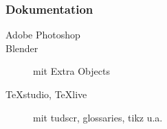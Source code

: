\subsubsection{Dokumentation}
\begin{description}
	\item [Adobe Photoshop]
	\item [Blender] mit Extra Objects
	\item [TeXstudio, TeXlive] mit tudscr, glossaries, tikz u.a.
\end{description}


\printbibliography[heading=bibintoc]\label{sec:bibliography}

\printindex %

